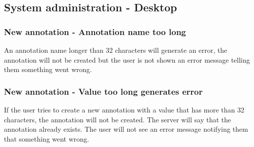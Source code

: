 \subsection{System administration - Desktop}

\subsubsection{New annotation - Annotation name too long}
An annotation name longer than 32 characters will generate an error,
the annotation will not be created but the user is not shown an
error message telling them something went wrong.

\subsubsection{New annotation - Value too long generates error}
If the user tries to create a new annotation with a value that has
more than 32 characters, the annotation will not be created. The
server will say that the annotation already exists. The user will not
see an error message notifying them that something went wrong. \\
\\



